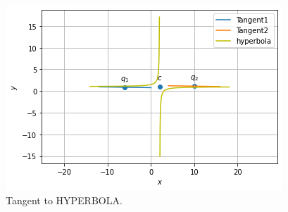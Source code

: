 \begin{figure}[!ht]
    \centering
    \includegraphics[width=\columnwidth]{solutions/su2021/2/75/HYPERBOLA.png}
    \caption{Tangent to HYPERBOLA.}
    \label{quadform/75/fig:Tangent to HYPERBOLA.}
\end{figure}  


